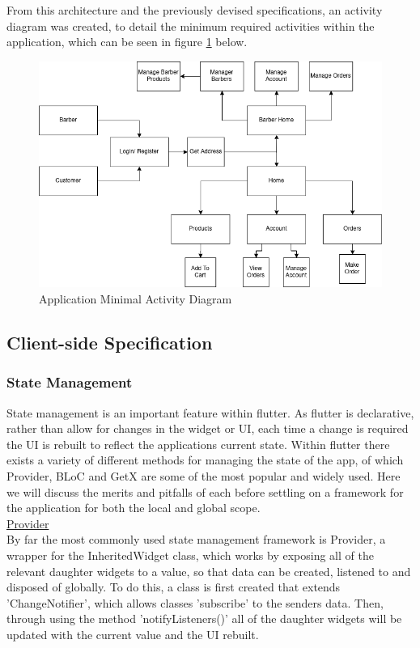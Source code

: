 \documentclass[12pt]{article}
\begin{document}
 	From this architecture and the previously devised specifications, an activity diagram was created, to detail the minimum required activities within the application, which can be seen in figure \ref{fig:activities} below.
 	
 	
 	\begin{figure}[H]
 		\centering
 		\includegraphics[scale=0.6]{images/activities.png}
 		\caption{Application Minimal Activity Diagram}
 		\label{fig:activities}
 	\end{figure}
	 
	

	
	\subsection{Client-side Specification}


	
	\subsubsection{State Management}
	State management is an important feature within flutter. As flutter is declarative, rather than allow for changes in the widget or UI, each time a change is required the UI is rebuilt to reflect the applications current state. Within flutter there exists a variety of different methods for managing the state of the app, of which Provider, BLoC and GetX are some of the most popular and widely used. Here we will discuss the merits and pitfalls of each before settling on a framework for the application for both the local and global scope.
	\\
	
	\noindent \underline{Provider}
	\\
	\noindent
	By far the most commonly used state management framework is Provider, a wrapper for the InheritedWidget class, which works by exposing all of the relevant daughter widgets to a value, so that data can be created, listened to and disposed of globally. To do this, a class is first created that extends 'ChangeNotifier', which allows classes 'subscribe' to the senders data. Then, through using the method 'notifyListeners()' all of the daughter widgets will be updated with the current value and the UI rebuilt.
	
\end{document}
